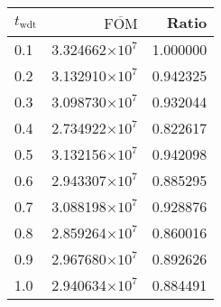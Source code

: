 \begin{tabular}{lrr}
\toprule
$t_{\mathrm{wdt}}$ & $\overline{\mathrm{FOM}}$ &    Ratio \\
\midrule
               0.1 &   3.324662$\times 10^{7}$ & 1.000000 \\
               0.2 &   3.132910$\times 10^{7}$ & 0.942325 \\
               0.3 &   3.098730$\times 10^{7}$ & 0.932044 \\
               0.4 &   2.734922$\times 10^{7}$ & 0.822617 \\
               0.5 &   3.132156$\times 10^{7}$ & 0.942098 \\
               0.6 &   2.943307$\times 10^{7}$ & 0.885295 \\
               0.7 &   3.088198$\times 10^{7}$ & 0.928876 \\
               0.8 &   2.859264$\times 10^{7}$ & 0.860016 \\
               0.9 &   2.967680$\times 10^{7}$ & 0.892626 \\
               1.0 &   2.940634$\times 10^{7}$ & 0.884491 \\
\bottomrule
\end{tabular}
